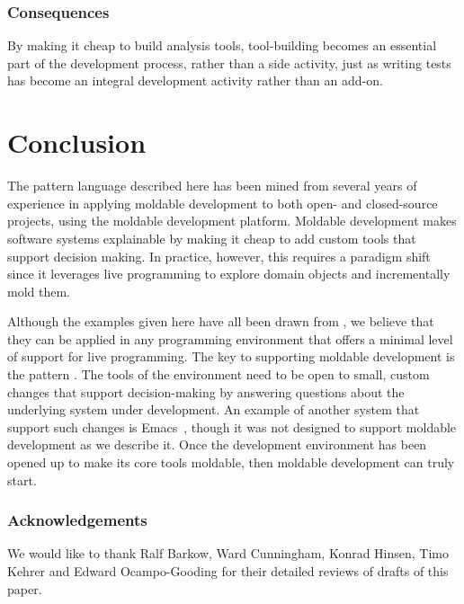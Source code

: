 \documentclass[sigconf]{acmart}
\newcommand{\pattern}[1]{\emph{\nameref{pat:#1}}\xspace}
\newcommand{\GT}{\lst{GT}\xspace} %
\begin{document}
\subsubsection*{Consequences}
By making it cheap to build analysis tools, tool-building becomes an essential part of the development process, rather than a side activity, just as writing tests has become an integral development activity rather than an add-on.

\section{Conclusion}

The pattern language described here has been mined from several years of experience in applying moldable development to both open- and closed-source projects, using the \GT moldable development platform.
Moldable development makes software systems explainable by making it cheap to add custom tools that support decision making.
In practice, however, this requires a paradigm shift since it leverages live programming to explore domain objects and incrementally mold them.

Although the examples given here have all been drawn from \GT, we believe that they can be applied in any programming environment that offers a minimal level of support for live programming.
The key to supporting moldable development is the pattern \pattern{moldableTool}.
The tools of the environment need to be open to small, custom changes that support decision-making by answering questions about the underlying system under development.
An example of another system that support such changes is Emacs~\cite{Stal81a}, though it was not designed to support moldable development as we describe it.
Once the development environment has been opened up to make its core tools moldable, then moldable development can truly start.

\subsubsection*{Acknowledgements}

We would like to thank Ralf Barkow, Ward Cunningham, Konrad Hinsen, Timo Kehrer and Edward Ocampo-Gooding for their detailed reviews of drafts of this paper.



\end{document}
